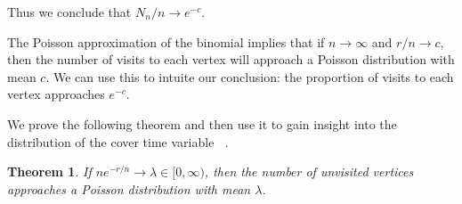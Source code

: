 \documentclass[12pt]{article}
\newtheorem{theorem}{Theorem}
\theoremstyle{definition}
\DeclareMathOperator{\cov}{\uptau_\textrm{cov}}  %
\begin{document}
Thus we conclude that $N_n/n \rightarrow e^{-c}$. 

The Poisson approximation of the binomial implies that if $n \rightarrow \infty$
and $r/n \rightarrow c$, then the number of visits to each vertex will approach
a Poisson distribution with mean $c$.
We can use this to intuite our conclusion: the proportion of visits to each vertex
approaches $e^{-c}$.

We prove the following theorem and then use it to gain insight into
the distribution of the cover time variable $\cov$.
\begin{theorem}\label{thm:pois}
If $ne^{-r/n} \rightarrow \lambda \in [0, \infty)$, then the number of unvisited
vertices approaches a Poisson distribution with mean $\lambda$.
\end{theorem}
\end{document}
